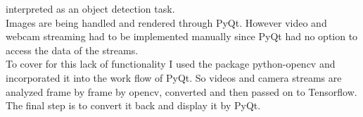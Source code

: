 \begin{itemize}
        interpreted as an object detection task. \\
        Images are being handled and rendered through PyQt. However video and webcam streaming had to be implemented manually since PyQt had
        no option to access the data of the streams.\\
        To cover for this lack of functionality I used the package python-opencv and incorporated it into the work flow of PyQt. So videos
        and camera streams are analyzed frame by frame by opencv, converted and then passed on to Tensorflow. The final step is to convert
        it back and display it by PyQt.
\end{itemize} 


